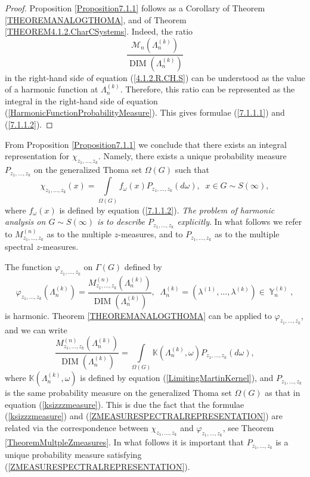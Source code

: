 \documentclass[12pt]{amsart}
\theoremstyle{definition}
\numberwithin{equation}{section}
\DeclareMathOperator{\Y}{\mathbb{Y}}
\DeclareMathOperator{\DIM}{DIM}
\begin{document}
\begin{proof}
Proposition \ref{Proposition7.1.1}
follows as a Corollary of Theorem \ref{THEOREMANALOGTHOMA}, and of Theorem
\ref{THEOREM4.1.2.CharCSystems}. Indeed, the ratio
$$
\frac{\mathcal{M}_n\left(\Lambda_n^{(k)}\right)}{\DIM\left(\Lambda_n^{(k)}\right)}
$$
in the right-hand side of equation (\ref{4.1.2.R.CH.S}) can be understood as the value of a harmonic function at $\Lambda_n^{(k)}$. Therefore, this ratio can be represented as the integral in the right-hand side of equation (\ref{HarmonicFunctionProbabilityMeasure}). This gives formulae (\ref{7.1.1.1}) and (\ref{7.1.1.2}).
\end{proof}
From Proposition \ref{Proposition7.1.1} we
conclude that there exists an integral representation for $\chi_{z_1,\ldots,z_k}$.
Namely, there exists a unique probability measure $P_{z_1,\ldots,z_k}$ on the generalized Thoma set $\Omega\left(G\right)$ such that
\begin{equation}\label{ksizzzmeasure}
\chi_{z_1,\ldots,z_k}(x)=\int\limits_{\Omega(G)}f_{\omega}(x)P_{z_1,\ldots,z_k}(d\omega),\;\; x\in G\sim S(\infty),
\end{equation}
where $f_{\omega}(x)$ is defined by equation (\ref{7.1.1.2}). \textit{The problem of harmonic analysis on $G\sim S(\infty)$ is to describe $P_{z_1,\ldots,z_k}$ explicitly}. In what follows we refer to $M_{z_1,\ldots,z_k}^{(n)}$ as to the multiple $z$-measures, and to $P_{z_1,\ldots,z_k}$ as to the multiple spectral $z$-measures.


The function $\varphi_{z_1,\ldots,z_k}$ on $\Gamma\left(G\right)$ defined by
$$
\varphi_{z_1,\ldots,z_k}\left(\Lambda_n^{(k)}\right)=
\frac{M_{z_1,\ldots,z_k}^{(n)}\left(\Lambda_n^{(k)}\right)}{\DIM\left(\Lambda_n^{(k)}\right)},
\;\;\Lambda_n^{(k)}=\left(\lambda^{(1)},\ldots,\lambda^{(k)}\right)\in\Y_n^{(k)},
$$
is harmonic. Theorem \ref{THEOREMANALOGTHOMA} can be applied to $\varphi_{z_1,\ldots,z_k}$, and we can write
\begin{equation}\label{ZMEASURESPECTRALREPRESENTATION}
\frac{M_{z_1,\ldots,z_k}^{(n)}\left(\Lambda_n^{(k)}\right)}{\DIM\left(\Lambda_n^{(k)}\right)}=\int\limits_{\Omega(G)}\mathbb{K}\left(\Lambda_n^{(k)},\omega\right)P_{z_1,\ldots,z_k}(d\omega),
\end{equation}
where $\mathbb{K}\left(\Lambda_n^{(k)},\omega\right)$ is defined by equation (\ref{LimitingMartinKernel}), and $P_{z_1,\ldots,z_k}$
is the same probability measure on the generalized Thoma set $\Omega(G)$
as  that in equation (\ref{ksizzzmeasure}). This is due the fact  that the formulae (\ref{ksizzzmeasure}) and
(\ref{ZMEASURESPECTRALREPRESENTATION}) are related via the correspondence between $\chi_{z_1,\ldots,z_k}$ and
$\varphi_{z_1,\ldots,z_k}$, see Theorem \ref{TheoremMultpleZmeasures}.
In what follows it is important that $P_{z_1,\ldots,z_k}$ is a unique
probability measure satisfying (\ref{ZMEASURESPECTRALREPRESENTATION}).
\end{document}
